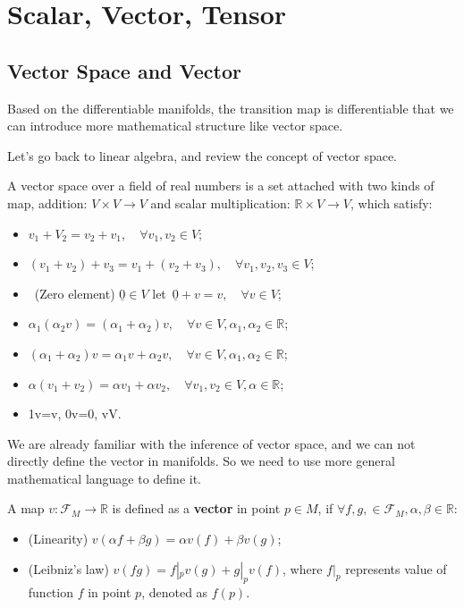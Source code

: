\section{Scalar, Vector, Tensor}

\subsection{Vector Space and Vector}

Based on the differentiable manifolds, the transition map is differentiable that we can introduce more mathematical structure like vector space.

Let's go back to linear algebra, and review the concept of vector space.

\begin{tcolorbox}[title=\textbf{Vector Space},colback=SeaGreen!10!CornflowerBlue!10,colframe=RoyalPurple!55!Aquamarine!100!]
    A vector space over a field of real numbers is a set attached with two kinds of map, addition: $V\times V\rightarrow V$ and scalar multiplication: $\mathbb{R}\times V\rightarrow V$, which satisfy:
    \begin{itemize}
        \item $v_{1}+V_{2}=v_{2}+v_{1}, \quad \forall v_{1},v_{2}\in V;$
        \item $(v_{1}+v_{2})+v_{3}=v_{1}+(v_{2}+v_{3}),\quad \forall v_{1},v_{2},v_{3}\in V$;
        \item \exists\, (Zero element) $\underline{0}\in V$ let \,$\underline{0}+v=v, \quad \forall v\in V$;
        \item $\alpha_{1}(\alpha_{2} v )=(\alpha_{1}+\alpha_{2})v,\quad  \forall v\in V, \alpha_{1},\alpha_{2}\in \mathbb{R} $;
        \item $(\alpha_{1}+\alpha_{2})v=\alpha_{1}v+\alpha_{2}v, \quad \forall v\in V,\alpha_{1}, \alpha_{2} \in \mathbb{R}$;
        \item $\alpha(v_{1}+v_{2})=\alpha v_{1}+\alpha v_{2},\quad \forall v_{1},v_{2}\in V, \alpha \in \mathbb{R}$;
        \item 1\cdot v=v, 0\cdot v=0, \quad v\in V.
    \end{itemize}
\end{tcolorbox}

We are already familiar with the inference of vector space, and we can not directly define the vector in manifolds. So we need to use more general mathematical language to define it.

\begin{tcolorbox}[title=\textbf{Vector},colback=SeaGreen!10!CornflowerBlue!10,colframe=RoyalPurple!55!Aquamarine!100!]
    A map $v:\mathscr{F}_{M}\rightarrow \mathbb{R}$ is defined as a \textbf{vector} in point $p\in M$, if $\forall f,g,\in \mathscr{F}_{M}, \alpha,\beta\in \mathbb{R}$:
    \begin{itemize}
        \item (Linearity) $v(\alpha f+\beta g)= \alpha v(f)+\beta v(g)$;
        \item (Leibniz's law) $v(fg)=f|_{p}v(g)+g|_{p}v(f)$,  where $f|_{p}$ represents value of function $f$ in point $p$, denoted as $f(p)$.
    \end{itemize}
\end{tcolorbox}

